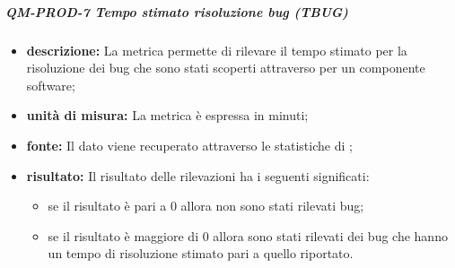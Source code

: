 			\subparagraph{ QM-PROD-7 Tempo stimato risoluzione bug (TBUG)}
			\begin{itemize}
      			\item \textbf{descrizione: }
					La metrica permette di rilevare il tempo stimato per la risoluzione dei bug che sono stati scoperti attraverso  per un componente software;
				\item \textbf{unità di misura: }
					La metrica è espressa in minuti;
				\item \textbf{fonte: }
					Il dato viene recuperato attraverso le statistiche di ;
				\item \textbf{risultato: }
					Il risultato delle rilevazioni ha i seguenti significati:
					\begin{itemize}
						\item se il risultato è pari a 0 allora non sono stati rilevati bug;
						\item se il risultato è maggiore di 0 allora sono stati rilevati dei bug che hanno un tempo di risoluzione stimato pari a quello riportato.
					\end{itemize}
			\end{itemize}
			


